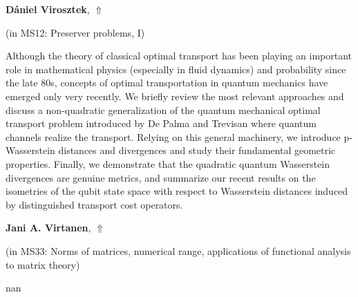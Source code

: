 \documentclass[ILAS2025-program.tex]{subfiles}
\begin{document}
\hypertarget{down0126}{}\begin{ilasabstract}
    
\textbf{Dániel Virosztek},  \hfill \hyperlink{up0126}{$\Uparrow$}
    
    
(in {\color{mstitle}MS12: Preserver problems, I})
        
\mtskip
    Although the theory of classical optimal transport has been playing an important role in mathematical physics (especially in fluid dynamics) and probability since the late 80s, concepts of optimal transportation in quantum mechanics have emerged only very recently. We briefly review the most relevant approaches and discuss a non-quadratic generalization of the quantum mechanical optimal transport problem introduced by De Palma and Trevisan where quantum channels realize the transport. Relying on this general machinery, we introduce p-Wasserstein distances and divergences and study their fundamental geometric properties. Finally, we demonstrate that the quadratic quantum Wasserstein divergences are genuine metrics, and summarize our recent results on the isometries of the qubit state space with respect to Wasserstein distances induced by distinguished transport cost operators.

\end{ilasabstract}
    

\hypertarget{down0246}{}\begin{ilasabstract}
    
\textbf{Jani A. Virtanen},  \hfill \hyperlink{up0246}{$\Uparrow$}
    
    
(in {\color{mstitle}MS33: Norms of matrices, numerical range, applications of functional analysis to matrix theory})
        
\mtskip
    nan
\end{ilasabstract}
    
\end{document}
